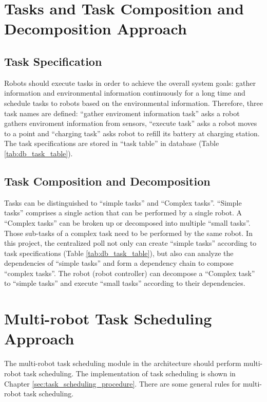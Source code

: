 
\section{Tasks and Task Composition and Decomposition Approach}

\subsection{Task Specification}
Robots should execute tasks in order to achieve the overall system goals: gather information and environmental information continuously for a long time and schedule tasks to robots based on the environmental information.  Therefore, three task names are defined: ``gather enviroment information task'' asks a robot gathers enviroment information from sensors, ``execute task'' asks a robot moves to a point and  ``charging task'' asks robot to refill its battery at charging station.
The task specifications are stored in ``task table'' in database (Table \ref{tab:db_task_table}).


\subsection{Task Composition and Decomposition}
Tasks can be distinguished to ``simple tasks'' and ``Complex tasks''.  ``Simple tasks'' comprises a single action that can be performed by a single robot. A ``Complex tasks'' can be broken up or decomposed into multiple ``small tasks''. Those sub-tasks of a complex task need to be performed by the same robot.
In this project, the centralized poll not only can create ``simple tasks'' according to task specifications (Table \ref{tab:db_task_table}), but also can analyze the dependencies of ``simple tasks'' and form a dependency chain to compose ``complex tasks''. The robot (robot controller) can decompose a ``Complex task'' to ``simple tasks'' and execute ``small tasks'' according to their dependencies.

\section{Multi-robot Task Scheduling Approach}
The multi-robot task scheduling module in the architecture should perform multi-robot task scheduling. 
The implementation of task scheduling is shown in Chapter \ref{sec:task_scheduling_procedure}. There are some general rules for multi-robot task scheduling.


